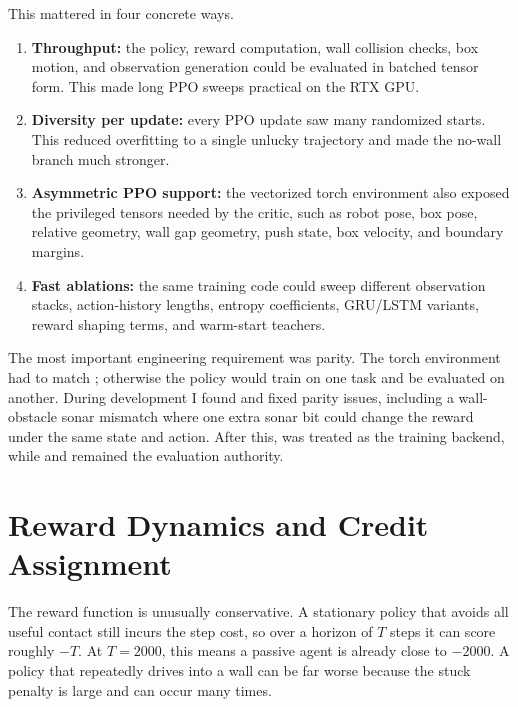\documentclass[11pt, oneside]{article}   	%
\begin{document}
This mattered in four concrete ways.
\begin{enumerate}[leftmargin=1.5em]
  \item \textbf{Throughput:} the policy, reward computation, wall collision checks, box
  motion, and observation generation could be evaluated in batched tensor form. This
  made long PPO sweeps practical on the RTX GPU.
  \item \textbf{Diversity per update:} every PPO update saw many randomized starts. This
  reduced overfitting to a single unlucky trajectory and made the no-wall branch much
  stronger.
  \item \textbf{Asymmetric PPO support:} the vectorized torch environment also exposed
  the privileged tensors needed by the critic, such as robot pose, box pose, relative
  geometry, wall gap geometry, push state, box velocity, and boundary margins.
  \item \textbf{Fast ablations:} the same training code could sweep different observation
  stacks, action-history lengths, entropy coefficients, GRU/LSTM variants, reward
  shaping terms, and warm-start teachers.
\end{enumerate}

The most important engineering requirement was parity. The torch environment had to
match ; otherwise the policy would train on one task and be evaluated on
another. During development I found and fixed parity issues, including a wall-obstacle
sonar mismatch where one extra sonar bit could change the reward under the same state
and action. After this,  was treated as the training backend, while
 and  remained the evaluation authority.

\section{Reward Dynamics and Credit Assignment}

The reward function is unusually conservative. A stationary policy that avoids all useful
contact still incurs the step cost, so over a horizon of \(T\) steps it can score roughly
\(-T\). At \(T=2000\), this means a passive agent is already close to \(-2000\). A
policy that repeatedly drives into a wall can be far worse because the stuck penalty is
large and can occur many times.
\end{document}
